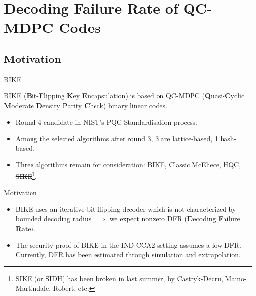 \section{Decoding Failure Rate of QC-MDPC Codes}

\subsection{Motivation}

\begin{frame}{BIKE}

BIKE (\textbf{B}it-\textbf{F}lipping \textbf{K}ey \textbf{E}ncapsulation) is based on QC-MDPC (\textbf{Q}uasi-\textbf{C}yclic \textbf{M}oderate \textbf{D}ensity \textbf{P}arity \textbf{C}heck) binary linear codes.

\begin{itemize}
    \item Round 4 candidate in NIST's PQC Standardisation process.
    \item Among the selected algorithms after round 3, 3 are lattice-based, 1 hash-based.
    \item Three algorithms remain for consideration: BIKE, Classic McEliece, HQC, \sout{SIKE}\footnote{SIKE (or SIDH) has been broken in last summer, by Castryk-Decru, Maino-Martindale, Robert, etc.}.
\end{itemize}
    
\end{frame}

\begin{frame}{Motivation}
\begin{itemize}
\item BIKE uses an iterative bit flipping decoder which is not characterized by bounded decoding radius $\implies$ we expect nonzero DFR (\textbf{D}ecoding \textbf{F}ailure \textbf{R}ate).
    \item The security proof of BIKE in the IND-CCA2 setting assumes a low DFR. Currently, DFR has been estimated through simulation and extrapolation.
\end{itemize}
\end{frame}

